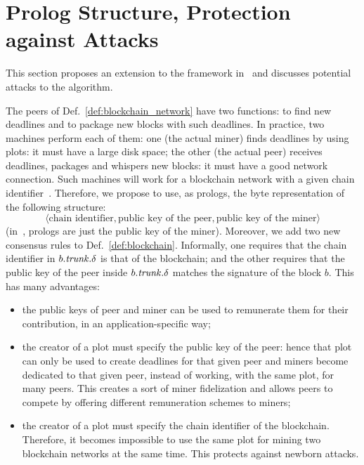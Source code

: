 \section{Prolog Structure, Protection against Attacks}\label{sec:prolog_structure_attacks}
%
This section proposes an extension to the framework in~\cite{SignumPlotting} and
discusses potential attacks to the algorithm.

The peers of Def.~\ref{def:blockchain_network} have two functions: to find new deadlines and to
package new blocks with such deadlines. In practice, two machines perform each of them:
one (the actual miner) finds deadlines by using plots: it must have a large disk space; the other (the actual peer)
receives deadlines, packages and whispers new blocks: it must have a good network connection.
Such machines will work for a blockchain network with a given chain identifier~\cite{Antonopoulos17}.
Therefore, we propose to use, as prologs, the byte representation of the following structure:
\[
\langle\text{chain identifier},\text{public key of the peer},\text{public key of the miner}\rangle
\]
(in~\cite{SignumPlotting}, prologs are just the public key of the miner).
Moreover, we add two new consensus rules to Def.~\ref{def:blockchain}. Informally, one requires
that the chain identifier in $b.{\mathit{trunk}}.\delta$ is that of the blockchain; and the other requires that
the public key of the peer inside $b.{\mathit{trunk}}.\delta$ matches the signature of the block $b$. This has many advantages:
%
\begin{itemize}
\item the public keys of peer and miner can be used to remunerate them for their contribution,
  in an application-specific way;
\item the creator of a plot must specify the public key of the peer: hence that plot
  can only be used to create deadlines for that given peer and miners become dedicated to that given
  peer, instead of working, with the same plot, for many peers. This creates a sort of miner
  fidelization and allows peers to compete by offering different remuneration schemes to miners;
\item the creator of a plot must specify the chain identifier of the blockchain.
  Therefore, it becomes impossible to use the same plot for mining two
  blockchain networks at the same time. This protects against newborn attacks.
\end{itemize}

